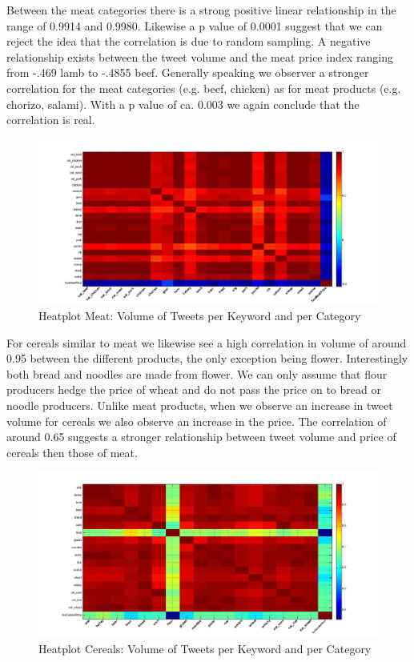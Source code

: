 Between the meat categories there is a strong positive linear relationship in the range of 0.9914 and 0.9980. Likewise a p value of 0.0001 suggest that we can reject the idea that the correlation is due to random sampling. A negative relationship exists between the tweet volume and the meat price index ranging from -.469 lamb to -.4855 beef. Generally speaking we observer a stronger correlation for the meat categories (e.g. beef, chicken) as for meat products (e.g. chorizo, salami). With a p value of ca. 0.003 we again conclude that the correlation is real. 


\begin{figure}[H]
        \centering
         \includegraphics[width=1\textwidth ]{img/anal/meat_heatplot_price}
              
        \caption{Heatplot Meat: Volume of Tweets per Keyword and per Category}
        \label{fig:distribution}
\end{figure}



For cereals similar to meat we likewise see a high correlation in volume of around 0.95 between the different products, the only exception being flower. Interestingly both bread and noodles are made from flower. We can only assume that flour producers hedge the price of wheat and do not pass the price on to bread or noodle producers. Unlike meat products, when we observe an increase in tweet volume for cereals we also observe an increase in the price. The correlation of around 0.65 suggests a stronger relationship between tweet volume and price of cereals then those of meat. 

\begin{figure}[H]
        \centering
         \includegraphics[width=1\textwidth ]{img/anal/cereals_heatplot}
              
        \caption{Heatplot Cereals: Volume of Tweets per Keyword and per Category}
        \label{fig:distribution}
\end{figure}
 
